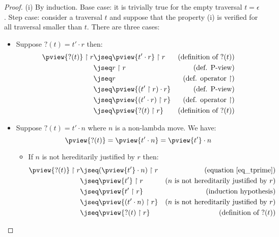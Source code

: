\begin{proof}
(i) By induction. Base case: it is trivially true for the empty
traversal $t = \epsilon$. Step case: consider a traversal $t$ and
suppose that the property (i) is verified for all traversal smaller
than $t$. There are three cases:
\begin{itemize}
\item Suppose $?(t) = t' \cdot r$ then:
    \begin{align*}
    \pview{?(t)} \upharpoonright  r
        &\jseq  \pview{t' \cdot r } \upharpoonright  r       & (\mbox{definition of } ?(t))\\
        &\jseq  r \upharpoonright  r                         & (\mbox{def. P-view})\\
        &\jseq  r                                                & (\mbox{def. operator $\upharpoonright$})\\
        &\jseq  \pview{(t' \upharpoonright  r ) \cdot r }    & (\mbox{def. P-view})\\
        &\jseq  \pview{(t' \cdot r)  \upharpoonright  r }    & (\mbox{def. operator $\upharpoonright$})\\
        &\jseq \pview{?(t) \upharpoonright  r }                & (\mbox{definition of } ?(t))
    \end{align*}

\item Suppose $?(t) = t' \cdot n$ where $n$ is a non-lambda
move. We have:
    \begin{equation}
    \pview{?(t)} = \pview{t' \cdot n} = \pview{t'} \cdot n  \label{eq_tprime}
    \end{equation}
    \begin{itemize}
    \item If $n$ is not hereditarily justified by $r$ then:
    \begin{align*}
    \pview{?(t)} \upharpoonright  r
        &\jseq (\pview{t'} \cdot n) \upharpoonright  r  & (\mbox{equation \ref{eq_tprime}}) \\
        &\jseq \pview{t'} \upharpoonright  r            & (n \mbox{ is not hereditarily justified by } r) \\
        &\jseq \pview{t' \upharpoonright  r }           & (\mbox{induction hypothesis}) \\
        &\jseq \pview{(t' \cdot n) \upharpoonright  r } & (n \mbox{ is not hereditarily justified by } r) \\
        &\jseq \pview{?(t) \upharpoonright  r  }           & (\mbox{definition of } ?(t))
    \end{align*}


\end{itemize}
\end{itemize}
\end{proof}
